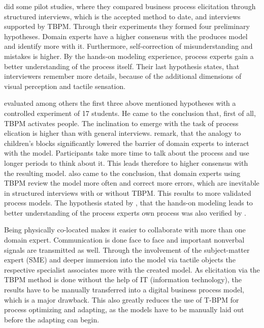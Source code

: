 	 did some pilot studies, where they compared business process elicitation
	through structured interviews, which is the accepted method to date, and interviews supported by TBPM. Through their
	experiments they formed four preliminary hypotheses. Domain experts have a higher consensus	%
	with the produces model and identify more with it. Furthermore, self-correction of			%
	misunderstanding and mistakes is higher. By the hands-on modeling experience, process experts %
	gain a better understanding of the process itself. Their last hypothesis states, that
	interviewers remember more details, because of the additional dimensions of visual perception and
	tactile sensation. 

	 evaluated among others the first three above mentioned hypotheses with a 
	controlled experiment of 17 students. He came to the conclusion that, first of all, TBPM 
	activates people. The inclination to emerge with the task of process elication is higher than
	with general interviews.  remark, that the analogy to children's blocks 
	significantly lowered the barrier of domain experts to interact with the model. Participants take 
	more time to talk about the process and use longer periods to think about it. This leads therefore 
	to higher consensus with the resulting model.
	 also came to the conclusion, that domain experts using TBPM review the model more
	often and correct more errors, which are inevitable in structured interviews with or without
	TBPM. This results to more validated process models. The hypothesis stated by ,
	that the hands-on modeling leads to better understanding of the process experts own process
	was also verified by .

	Being physically co-located makes it easier to collaborate with more than one domain expert. Communication is done face
	to face and important nonverbal signals are transmitted as well. Through the involvement of the subject-matter expert (SME)
	and deeper immersion into the model via tactile objects the respective specialist associates more with the
	created model. 
	As elicitation via the TBPM method is done without the help of IT (information technology), the results have to be 
	manually transferred into a digital business process model, which is a major drawback. This also greatly reduces the
	use of T-BPM for process optimizing and adapting, as the models have to be manually laid out before the adapting 
	can begin. \\	
	
